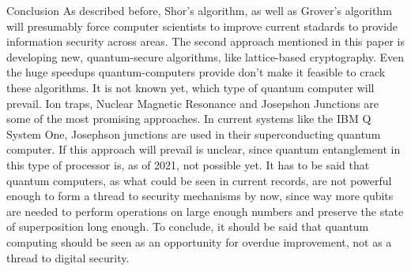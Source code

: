 \documentclass[aps,preprintnumbers,twocolumn]{revtex4}
\begin{document}
\begin{section}{Conclusion}
As described before, Shor's algorithm, 
as well as Grover's algorithm will presumably force computer scientists to improve current stadards to provide information security across areas. 
The second approach mentioned in this paper is developing new, 
quantum-secure algorithms, 
like lattice-based cryptography. 
Even the huge speedups quantum-computers provide don't make it feasible to crack these algorithms. 
It is not known yet, which type of quantum computer will prevail. 
Ion traps, Nuclear Magnetic Resonance and Josepshon Junctions are some of the most promising approaches. 
In current systems like the IBM Q System One, 
Josephson junctions are used in their superconducting quantum computer. 
If this approach will prevail is unclear, 
since quantum entanglement in this type of processor is, as of 2021, not possible yet. 
It has to be said that quantum computers, 
as what could be seen in current records,  
are not powerful enough to form a thread to security mechanisms by now, 
since way more qubits are needed to perform operations on large enough numbers and preserve the state of superposition long enough. 
To conclude, it should be said that quantum computing should be seen as an opportunity for overdue improvement, not as a thread to digital security. 
\end{section}



\end{document}
